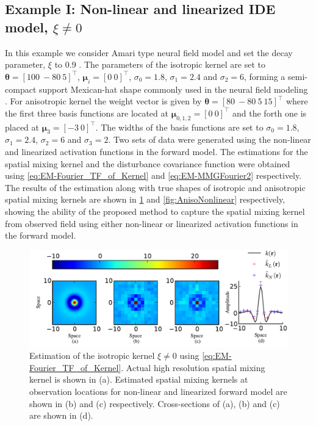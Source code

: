 \documentclass[10pt,twocolumn,twoside]{IEEEtran}
\begin{document}
\subsection{Example I: Non-linear and linearized IDE model, $\xi\neq 0$}
In this example we consider Amari type neural field model and set the decay parameter, $\xi$  to 0.9 \cite{Freestone2011}.
The parameters of the isotropic kernel are set to $\boldsymbol\theta=[100~-80~5]^{\top}$,  $\boldsymbol\mu_i=[0~0]^{\top}$, $\sigma_0=1.8$, $\sigma_1=2.4$ and $\sigma_2=6$, forming a semi-compact support Mexican-hat shape commonly used in the neural field modeling \cite{Amari1977,Atay2005,Breakspear2010}.
For anisotropic kernel the weight vector is given by $\boldsymbol\theta=[80~-80~5~15]^{\top}$ where the first three basis functions are located at $\boldsymbol\mu_{0,1,2}=[0~0]^{\top}$ and the forth one is placed at $\boldsymbol\mu_3=[-3~0]^{\top}$.
The widths of the basis functions are set to $\sigma_0=1.8$, $\sigma_1=2.4$, $\sigma_2=6$ and $\sigma_3=2$.
Two sets of data were generated using the non-linear and linearized activation functions in the forward model.
The estimations for the spatial mixing kernel and the disturbance covariance function were obtained using \eqref{eq:EM-Fourier_TF_of_Kernel} and \eqref{eq:EM-MMGFourier2} respectively.
The results of the estimation along with true shapes of isotropic and anisotropic spatial mixing kernels are shown in \figurename{\ref{fig:IsoNonlinear}} and \figurename{\ref{fig:AnisoNonlinear}} respectively, showing the ability of the proposed method to capture the spatial mixing kernel from observed field using either non-linear or linearized activation functions in the forward model.

\begin{figure}[]
	\centering
		\includegraphics[scale=1]{./Graph/IsoKernelIEEE.pdf}
	\caption{Estimation of the isotropic kernel $\xi\neq 0$ using \eqref{eq:EM-Fourier_TF_of_Kernel}.
Actual high resolution spatial mixing kernel is shown in (a).
Estimated spatial mixing kernels at observation locations for non-linear and linearized forward model are shown in (b) and (c) respectively.
Cross-sections of (a), (b) and (c) are shown in (d).}
	\label{fig:IsoNonlinear}
\end{figure}
  
\end{document}
